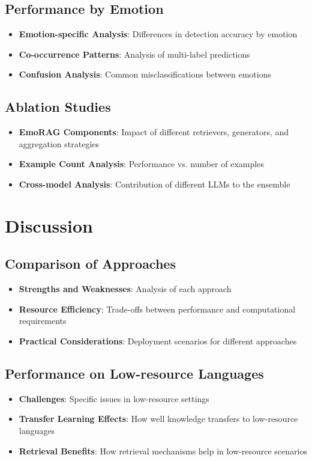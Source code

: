 \documentclass[a4paper,12pt]{extarticle}
\begin{document}
\subsection{Performance by Emotion}
\begin{itemize}
\item \textbf{Emotion-specific Analysis}: Differences in detection accuracy by emotion
\item \textbf{Co-occurrence Patterns}: Analysis of multi-label predictions
\item \textbf{Confusion Analysis}: Common misclassifications between emotions
\end{itemize}

\subsection{Ablation Studies}
\begin{itemize}
\item \textbf{EmoRAG Components}: Impact of different retrievers, generators, and aggregation strategies
\item \textbf{Example Count Analysis}: Performance vs. number of examples
\item \textbf{Cross-model Analysis}: Contribution of different LLMs to the ensemble
\end{itemize}

\section{Discussion}

\subsection{Comparison of Approaches}
\begin{itemize}
\item \textbf{Strengths and Weaknesses}: Analysis of each approach
\item \textbf{Resource Efficiency}: Trade-offs between performance and computational requirements
\item \textbf{Practical Considerations}: Deployment scenarios for different approaches
\end{itemize}

\subsection{Performance on Low-resource Languages}
\begin{itemize}
\item \textbf{Challenges}: Specific issues in low-resource settings
\item \textbf{Transfer Learning Effects}: How well knowledge transfers to low-resource languages
\item \textbf{Retrieval Benefits}: How retrieval mechanisms help in low-resource scenarios
\end{itemize}
\end{document}
